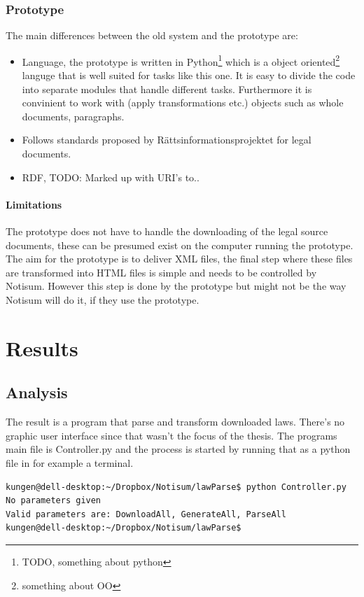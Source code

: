 \documentclass[a4paper,11pt]{kth-mag}
\begin{document}
\section{Prototype}
The main differences between the old system and the prototype are: 
\begin{itemize}
\item Language, the prototype is written in Python\footnote{TODO, something about python} which is a object oriented\footnote{something about OO} languge that is well suited for tasks like this one. It is easy to divide the code into separate modules that handle different tasks. Furthermore it is convinient to work with (apply transformations etc.) objects such as whole documents, paragraphs. 
\item Follows standards proposed by Rättsinformationsprojektet for legal documents.   
\item RDF, TODO: Marked up with URI's to.. 
\end{itemize} 

\subsection{Limitations}
The prototype does not have to handle the downloading of the legal source documents, these can be presumed exist on the computer running the prototype. \\The aim for the prototype is to deliver XML files, the final step where these files are transformed into HTML files is simple and needs to be controlled by Notisum. However this step is done by the prototype but might not be the way Notisum will do it, if they use the prototype.

\part{Results}

\chapter{Analysis}

The result is a program that parse and transform downloaded laws. There’s no graphic user interface since that wasn’t the focus of the thesis. The programs main file is Controller.py and the process is started by running that as a python file in for example a terminal. 

\begin{lstlisting}[language=bash, caption=Command to run the program]
kungen@dell-desktop:~/Dropbox/Notisum/lawParse$ python Controller.py
No parameters given
Valid parameters are: DownloadAll, GenerateAll, ParseAll
kungen@dell-desktop:~/Dropbox/Notisum/lawParse$ 
\end{lstlisting}
\end{document}
